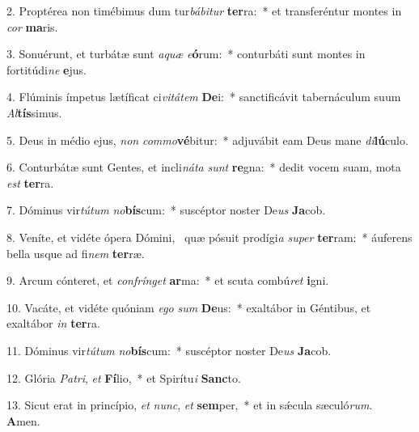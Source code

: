 2. Proptérea non timébimus dum tur\textit{bá}\textit{bi}\textit{tur} \textbf{ter}ra:~*  et transferéntur montes in \textit{cor} \textbf{ma}ris.\

3. Sonuérunt, et turbátæ sunt \textit{a}\textit{quæ} \textit{e}\textbf{ó}rum:~*  conturbáti sunt montes in fortitúdi\textit{ne} \textbf{e}jus.\

4. Flúminis ímpetus lætíficat ci\textit{vi}\textit{tá}\textit{tem} \textbf{De}i:~*  sanctificávit tabernáculum suum \textit{Al}\textbf{tís}simus.\

5. Deus in médio ejus, \textit{non} \textit{com}\textit{mo}\textbf{vé}bitur:~*  adjuvábit eam Deus mane \textit{di}\textbf{lú}culo.\

6. Conturbátæ sunt Gentes, et incli\textit{ná}\textit{ta} \textit{sunt} \textbf{re}gna:~*  dedit vocem suam, mota \textit{est} \textbf{ter}ra.\

7. Dóminus vir\textit{tú}\textit{tum} \textit{no}\textbf{bís}cum:~*  suscéptor noster De\textit{us} \textbf{Ja}cob.\

8. Veníte, et vidéte ópera Dómini, \dag\  quæ pósuit prodígi\textit{a} \textit{su}\textit{per} \textbf{ter}ram:~*  áuferens bella usque ad fi\textit{nem} \textbf{ter}ræ.\

9. Arcum cónteret, et \textit{con}\textit{frín}\textit{get} \textbf{ar}ma:~*  et scuta combú\textit{ret} \textbf{i}gni.\

10. Vacáte, et vidéte quóniam \textit{e}\textit{go} \textit{sum} \textbf{De}us:~*  exaltábor in Géntibus, et exaltábor \textit{in} \textbf{ter}ra.\

11. Dóminus vir\textit{tú}\textit{tum} \textit{no}\textbf{bís}cum:~*  suscéptor noster De\textit{us} \textbf{Ja}cob.\

12. Glória \textit{Pa}\textit{tri}, \textit{et} \textbf{Fí}lio,~*  et Spirítu\textit{i} \textbf{Sanc}to.\

13. Sicut erat in princípio, \textit{et} \textit{nunc}, \textit{et} \textbf{sem}per,~*  et in sǽcula sæculó\textit{rum}. \textbf{A}men.\

